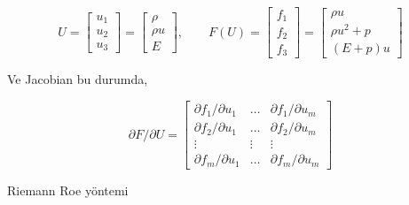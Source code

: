 \documentclass[12pt,fleqn]{article}\usepackage{../../common}
\begin{document}
$$
U =
\left[\begin{array}{c}
u_1 \\ u_2  \\ u_3
\end{array}\right] = 
\left[\begin{array}{c}
\rho \\ \rho u  \\ E
\end{array}\right], \qquad
F(U) =
\left[\begin{array}{c}
f_1 \\ f_2  \\ f_3
\end{array}\right] = 
\left[\begin{array}{c}
\rho u \\ \rho u^2 + p \\ (E+p) u 
\end{array}\right]
$$

Ve Jacobian bu durumda,

$$
\partial F / \partial U =
\left[\begin{array}{ccc}
\partial f_1 / \partial u_1 & \dots & \partial f_1 / \partial u_m \\
\partial f_2 / \partial u_1 & \dots & \partial f_2 / \partial u_m \\
\vdots & \vdots & \vdots \\
\partial f_m / \partial u_1 & \dots & \partial f_m / \partial u_m 
\end{array}\right]
$$





Riemann Roe yöntemi 
\end{document}
